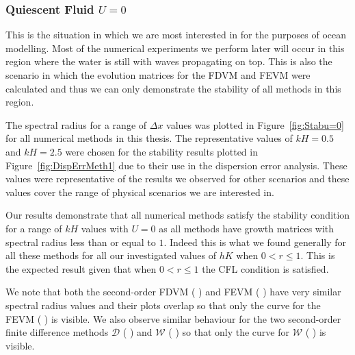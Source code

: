 \subsubsection{Quiescent Fluid $U=0$}
This is the situation in which we are most interested in for the purposes of ocean modelling. Most of the numerical experiments we perform later will occur in this region where the water is still with waves propagating on top. This is also the scenario in which the evolution matrices for the FDVM and FEVM were calculated and thus we can only demonstrate the stability of all methods in this region.

The spectral radius for a range of $\Delta x$ values was plotted in Figure~\ref{fig:Stabu=0} for all numerical methods in this thesis. The representative values of $kH =0.5$ and $kH = 2.5$ were chosen for the stability results plotted in Figure~\ref{fig:DispErrMeth1} due to their use in the dispersion error analysis. These values were representative of the results we observed for other scenarios and these values cover the range of physical scenarios we are interested in. 

Our results demonstrate that all numerical methods satisfy the stability condition for a range of $kH$ values with $U=0$ as all methods have growth matrices with spectral radius less than or equal to $1$. Indeed this is what we found generally for all these methods for all our investigated values of $hK$ when $0 < r \le 1$. This is the expected result given that when $0 < r \le 1$ the CFL condition is satisfied.

We note that both the second-order FDVM ({\color{red} \solidrule}) and FEVM ({\color{blue} \solidrule}) have very similar spectral radius values and their plots overlap so that only the curve for the FEVM ({\color{blue} \solidrule}) is visible. We also observe similar behaviour for the two second-order finite difference methods $\mathcal{D}$ ({\color{violet!80!white} \solidrule}) and $\mathcal{W}$ ({\color{orange} \solidrule}) so that only the curve for $\mathcal{W}$ ({\color{orange} \solidrule}) is visible.

